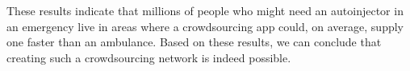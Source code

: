 These results indicate that millions of people who might need an autoinjector in an emergency live in areas where a crowdsourcing app could, on average, supply one faster than an ambulance. Based on these results, we can conclude that creating such a crowdsourcing network is indeed possible.



%
%
%
%
%






